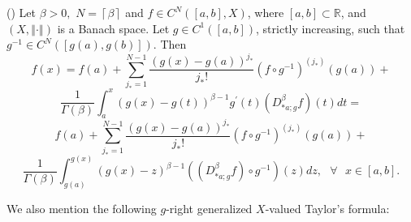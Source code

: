 \documentclass[10pt]{NSP1}
\numberwithin{equation}{section}
\begin{document}
\begin{theorem}
\label{t6}(\cite{5}) Let $\beta >0,$ $N=\left\lceil \beta \right\rceil $ and
$f\in C^{N}\left( \left[ a,b\right] ,X\right) $, where $\left[ a,b\right]
\subset \mathbb{R}$, and $\left( X,\left\Vert \cdot \right\Vert \right) $ is
a Banach space. Let $g\in C^{1}\left( \left[ a,b\right] \right) $, strictly
increasing, such that $g^{-1}\in C^{N}\left( \left[ g\left( a\right)
,g\left( b\right) \right] \right) .$ Then
\begin{equation*}
f\left( x\right) =f\left( a\right) +\sum_{j_{\ast }=1}^{N-1}\frac{\left(
g\left( x\right) -g\left( a\right) \right) ^{j_{\ast }}}{j_{\ast }!}\left(
f\circ g^{-1}\right) ^{\left( j_{\ast }\right) }\left( g\left( a\right)
\right) +
\end{equation*}
\begin{equation*}
\frac{1}{\Gamma \left( \beta \right) }\int_{a}^{x}\left( g\left( x\right)
-g\left( t\right) \right) ^{\beta -1}g^{\prime }\left( t\right) \left(
D_{\ast a;g}^{\beta }f\right) \left( t\right) dt=
\end{equation*}
\begin{equation}
f\left( a\right) +\sum_{j_{\ast }=1}^{N-1}\frac{\left( g\left( x\right)
-g\left( a\right) \right) ^{j_{\ast }}}{j_{\ast }!}\left( f\circ
g^{-1}\right) ^{\left( j_{\ast }\right) }\left( g\left( a\right) \right) +
\tag{21}  \label{21}
\end{equation}
\begin{equation*}
\frac{1}{\Gamma \left( \beta \right) }\int_{g\left( a\right) }^{g\left(
x\right) }\left( g\left( x\right) -z\right) ^{\beta -1}\left( \left( D_{\ast
a;g}^{\beta }f\right) \circ g^{-1}\right) \left( z\right) dz,\text{ \ }%
\forall \text{ }x\in \left[ a,b\right] .
\end{equation*}
\end{theorem}

We also mention the following $g$-right generalized $X$-valued Taylor's
formula:
\end{document}
